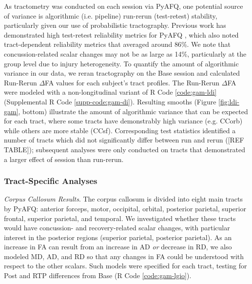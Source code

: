 \documentclass[12pt]{article}
\begin{document}
As tractometry was conducted on each session via PyAFQ, one potential source of variance is algorithmic (i.e. pipeline) run-rerun (test-retest) stability, particularly given our use of probabilistic tractography. Previous work has demonstrated high test-retest reliability metrics for PyAFQ \parencite{kruper2021EvaluatingReliabilityHuman}, which also noted tract-dependent reliability metrics that averaged around 86\%. We note that concussion-related scalar changes may not be as large as 14\%, particularly at the group level due to injury heterogeneity. To quantify the amount of algorithmic variance in our data, we reran tractography on the Base session and calculated Run-Rerun $\Delta$FA values for each subject's tract profiles. The Run-Rerun $\Delta$FA were modeled with a non-longitudinal variant of R Code \ref{code:gam-ldi} (Supplemental R Code \ref{supp-code:gam-di}). Resulting smooths (Figure \ref{fig:ldi-gam}, bottom) illustrate the amount of algorithmic variance that can be expected for each tract, where some tracts have demonstrably high variance (e.g. CCorb) while others are more stable (CCsf). Corresponding test statistics identified a number of tracts which did not significantly differ between run and rerun ([REF TABLE]); subsequent analyses were only conducted on tracts that demonstrated a larger effect of session than run-rerun.



\subsubsection{Tract-Specific Analyses}
\label{sssec:res-dwi-tract-tsa}
\textit{Corpus Callosum Results}. The corpus callosum is divided into eight main tracts by PyAFQ: anterior forceps, motor, occipital, orbital, posterior parietal, superior frontal, superior parietal, and temporal. We investigated whether these tracts would have concussion- and recovery-related scalar changes, with particular interest in the posterior regions (superior parietal, posterior parietal). As an increase in FA can result from an increase in AD \textit{or} decrease in RD, we also modeled MD, AD, and RD so that any changes in FA could be understood with respect to the other scalars. Such models were specified for each tract, testing for Post and RTP differences from Base (R Code \ref{code:gam-lgio}).
\end{document}
